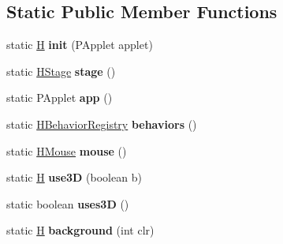 \subsection*{Static Public Member Functions}
\begin{DoxyCompactItemize}
\item 
\hypertarget{classhype_1_1core_1_1util_1_1_h_ac09ee2157a1086e1bebd2ba8d874e34e}{static \hyperlink{classhype_1_1core_1_1util_1_1_h}{H} {\bfseries init} (P\-Applet applet)}\label{classhype_1_1core_1_1util_1_1_h_ac09ee2157a1086e1bebd2ba8d874e34e}

\item 
\hypertarget{classhype_1_1core_1_1util_1_1_h_ae68131572db9c45d84cb9bb46d903ce0}{static \hyperlink{classhype_1_1core_1_1drawable_1_1_h_stage}{H\-Stage} {\bfseries stage} ()}\label{classhype_1_1core_1_1util_1_1_h_ae68131572db9c45d84cb9bb46d903ce0}

\item 
\hypertarget{classhype_1_1core_1_1util_1_1_h_a138b021226b142d7735897e2103e4351}{static P\-Applet {\bfseries app} ()}\label{classhype_1_1core_1_1util_1_1_h_a138b021226b142d7735897e2103e4351}

\item 
\hypertarget{classhype_1_1core_1_1util_1_1_h_a6c1d6080ee2a53c1cdb7a92a7e89a024}{static \hyperlink{classhype_1_1core_1_1behavior_1_1_h_behavior_registry}{H\-Behavior\-Registry} {\bfseries behaviors} ()}\label{classhype_1_1core_1_1util_1_1_h_a6c1d6080ee2a53c1cdb7a92a7e89a024}

\item 
\hypertarget{classhype_1_1core_1_1util_1_1_h_ab6f2778393309aaf78d805428a9d21e4}{static \hyperlink{classhype_1_1core_1_1util_1_1_h_mouse}{H\-Mouse} {\bfseries mouse} ()}\label{classhype_1_1core_1_1util_1_1_h_ab6f2778393309aaf78d805428a9d21e4}

\item 
\hypertarget{classhype_1_1core_1_1util_1_1_h_a9c3fcffb0176c94b40eafd8965ddd627}{static \hyperlink{classhype_1_1core_1_1util_1_1_h}{H} {\bfseries use3\-D} (boolean b)}\label{classhype_1_1core_1_1util_1_1_h_a9c3fcffb0176c94b40eafd8965ddd627}

\item 
\hypertarget{classhype_1_1core_1_1util_1_1_h_a71eb199df13ab497e6659ae4de4d4e11}{static boolean {\bfseries uses3\-D} ()}\label{classhype_1_1core_1_1util_1_1_h_a71eb199df13ab497e6659ae4de4d4e11}

\item 
\hypertarget{classhype_1_1core_1_1util_1_1_h_aeafaca7f3a27478632e00267edb24e61}{static \hyperlink{classhype_1_1core_1_1util_1_1_h}{H} {\bfseries background} (int clr)}\label{classhype_1_1core_1_1util_1_1_h_aeafaca7f3a27478632e00267edb24e61}


\end{DoxyCompactItemize}
